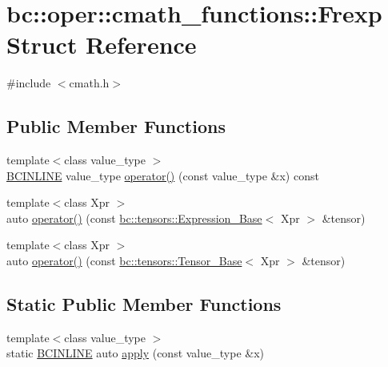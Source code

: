 \hypertarget{structbc_1_1oper_1_1cmath__functions_1_1Frexp}{}\section{bc\+:\+:oper\+:\+:cmath\+\_\+functions\+:\+:Frexp Struct Reference}
\label{structbc_1_1oper_1_1cmath__functions_1_1Frexp}


{\ttfamily \#include $<$cmath.\+h$>$}

\subsection*{Public Member Functions}
\begin{DoxyCompactItemize}
\item 
{\footnotesize template$<$class value\+\_\+type $>$ }\\\hyperlink{common_8h_a6699e8b0449da5c0fafb878e59c1d4b1}{B\+C\+I\+N\+L\+I\+NE} value\+\_\+type \hyperlink{structbc_1_1oper_1_1cmath__functions_1_1Frexp_abc5bb0ebd00be03e1047030e0668ce18}{operator()} (const value\+\_\+type \&x) const
\item 
{\footnotesize template$<$class Xpr $>$ }\\auto \hyperlink{structbc_1_1oper_1_1cmath__functions_1_1Frexp_aaba2f5528d6ad335863154f6976d800a}{operator()} (const \hyperlink{classbc_1_1tensors_1_1Expression__Base}{bc\+::tensors\+::\+Expression\+\_\+\+Base}$<$ Xpr $>$ \&tensor)
\item 
{\footnotesize template$<$class Xpr $>$ }\\auto \hyperlink{structbc_1_1oper_1_1cmath__functions_1_1Frexp_a4b62761222a4a64a1238068a62f51868}{operator()} (const \hyperlink{classbc_1_1tensors_1_1Tensor__Base}{bc\+::tensors\+::\+Tensor\+\_\+\+Base}$<$ Xpr $>$ \&tensor)
\end{DoxyCompactItemize}
\subsection*{Static Public Member Functions}
\begin{DoxyCompactItemize}
\item 
{\footnotesize template$<$class value\+\_\+type $>$ }\\static \hyperlink{common_8h_a6699e8b0449da5c0fafb878e59c1d4b1}{B\+C\+I\+N\+L\+I\+NE} auto \hyperlink{structbc_1_1oper_1_1cmath__functions_1_1Frexp_a2cfad9ef9e2182294e091caa963cf721}{apply} (const value\+\_\+type \&x)
\end{DoxyCompactItemize}


